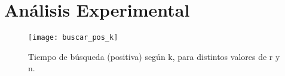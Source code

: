 \section{Análisis Experimental}

\begin{figure}
  \begin{center}
  \texttt{[image: buscar\_pos\_k]}
  \caption{Tiempo de búsqueda (positiva)
    según k, para distintos valores de r y n.}
  \label{fig:buscar-pos-segun-k}
  \end{center}
\end{figure}